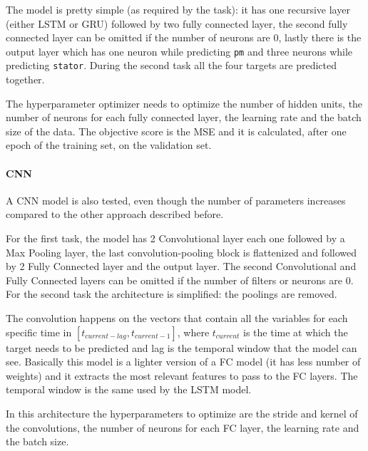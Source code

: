 The model is pretty simple (as required by the task): it has one recursive layer (either LSTM or GRU) followed by two fully connected layer, the second fully connected layer can be omitted if the number of neurons are 0, lastly there is the output layer which has one neuron while predicting \verb|pm| and three neurons while predicting \verb|stator|.
During the second task all the four targets are predicted together.

The hyperparameter optimizer needs to optimize the number of hidden units, the number of neurons for each fully connected layer, the learning rate and the batch size of the data.
The objective score is the MSE and it is calculated, after one epoch of the training set, on the validation set.

\paragraph{CNN}
A CNN model is also tested, even though the number of parameters increases compared to the other approach described before.

For the first task, the model has 2 Convolutional layer each one followed by a Max Pooling layer, the last convolution-pooling block is flattenized and followed by 2 Fully Connected layer and the output layer. The second Convolutional and Fully Connected layers can be omitted if the number of filters or neurons are 0. For the second task the architecture is simplified: the poolings are removed.
 
The convolution happens on the vectors that contain all the variables for each specific time in $[t_{current-lag},t_{current-1}]$, where $t_{current}$ is the time at which the target needs to be predicted and lag is the temporal window that the model can see.
Basically this model is a lighter version of a FC model (it has less number of weights) and it extracts the most relevant features to pass to the FC layers.
The temporal window is the same used by the LSTM model.

In this architecture the hyperparameters to optimize are the stride and kernel of the convolutions, the number of neurons for each FC layer, the learning rate and the batch size.

